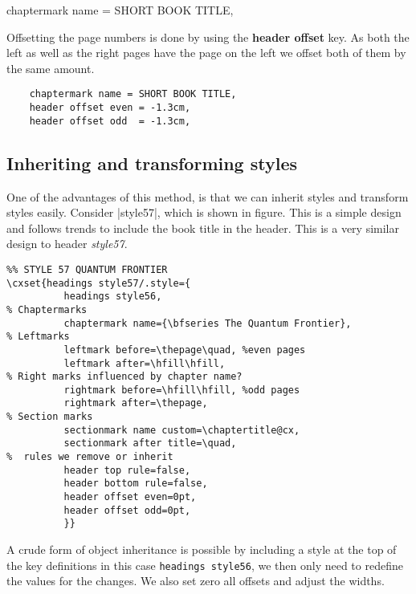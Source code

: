 \begin{tcolorbox}
   chaptermark name = SHORT BOOK TITLE,
\end{tcolorbox}

Offsetting the page numbers is done by using the \textbf{header offset} key. As both the left as well as the right pages have the page on the left we offset both of them by the same amount.

\begin{tcolorbox}
\begin{lstlisting}
    chaptermark name = SHORT BOOK TITLE,
    header offset even = -1.3cm,
    header offset odd  = -1.3cm,
\end{lstlisting}
\end{tcolorbox}

\subsection{Inheriting and transforming styles}

One of the advantages of this method, is that we can inherit styles and transform styles easily. Consider |style57|, which is shown in figure. This is a simple design and follows trends to include the book title in the header. This is a very similar design to header \textit{style57}.

\begin{tcolorbox}
\begin{lstlisting}
%% STYLE 57 QUANTUM FRONTIER
\cxset{headings style57/.style={
          headings style56,
% Chaptermarks
          chaptermark name={\bfseries The Quantum Frontier},
% Leftmarks
          leftmark before=\thepage\quad, %even pages
          leftmark after=\hfill\hfill,
% Right marks influenced by chapter name?
          rightmark before=\hfill\hfill, %odd pages
          rightmark after=\thepage,
% Section marks
          sectionmark name custom=\chaptertitle@cx,
          sectionmark after title=\quad,
%  rules we remove or inherit
          header top rule=false,
          header bottom rule=false,
          header offset even=0pt,
          header offset odd=0pt,
          }}
\end{lstlisting}
\end{tcolorbox}

A crude form of object inheritance is possible by including a style at the top of the key definitions in this case \texttt{headings style56}, we then only need to redefine the values for the changes. We also set zero all offsets and adjust the widths.

